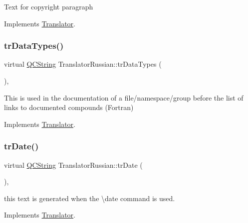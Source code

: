 Text for copyright paragraph 

Implements \mbox{\hyperlink{class_translator}{Translator}}.

\mbox{\label{class_translator_russian_ad832f9bf77d2850739472dd0631e364a}} 
\subsubsection{\texorpdfstring{trDataTypes()}{trDataTypes()}}
{\footnotesize\ttfamily virtual \mbox{\hyperlink{class_q_c_string}{Q\+C\+String}} Translator\+Russian\+::tr\+Data\+Types (\begin{DoxyParamCaption}{ }\end{DoxyParamCaption})\hspace{0.3cm}{\ttfamily [inline]}, {\ttfamily [virtual]}}

This is used in the documentation of a file/namespace/group before the list of links to documented compounds (Fortran) 

Implements \mbox{\hyperlink{class_translator}{Translator}}.

\mbox{\label{class_translator_russian_a9cd10d61ec8029873f5f5b920830d206}} 
\subsubsection{\texorpdfstring{trDate()}{trDate()}}
{\footnotesize\ttfamily virtual \mbox{\hyperlink{class_q_c_string}{Q\+C\+String}} Translator\+Russian\+::tr\+Date (\begin{DoxyParamCaption}{ }\end{DoxyParamCaption})\hspace{0.3cm}{\ttfamily [inline]}, {\ttfamily [virtual]}}

this text is generated when the \textbackslash{}date command is used. 

Implements \mbox{\hyperlink{class_translator}{Translator}}.

\mbox{\label{class_translator_russian_a7d56c21f1f862928a715b3f45511909e}} 
